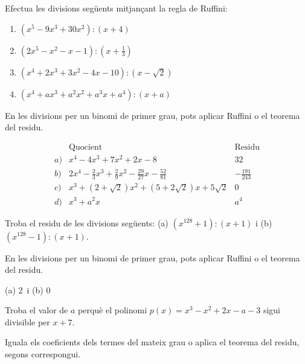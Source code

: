 \begin{exercici}
Efectua les divisions següents mitjançant la regla de Ruffini:

\begin{enumerate}
\item[a)] $(x^{5}-9x^{3}+30x^{2}):(x+4)$

\item[b)] $(2x^{5}-x^{2}-x-1):(x+\frac{1}{3})$

\item[c)] $(x^{4}+2x^{3}+3x^{2}-4x-10):(x-\sqrt{2})$

\item[d)] $(x^{4}+ax^{3}+a^{2}x^{2}+a^{3}x+a^{4}):(x+a)$
\end{enumerate}
\end{exercici}
\begin{indicacio}
En les divisions per un binomi de primer grau, pots aplicar Ruffini o el teorema del residu.
\end{indicacio}

\begin{solucio}
\[
\begin{array}{lll}
& \text{Quocient} & \text{Residu} \\
a) & x^{4}-4x^{3}+7x^{2}+2x-8 & 32 \\
b) & 2x^{4}-\frac{2}{3}x^{3}+\frac{2}{9}x^{2}-\frac{29}{27}x-\frac{52}{81} &
-\frac{191}{243} \\
c) & x^{3}+(2+\sqrt{2})x^{2}+(5+2\sqrt{2})x+5\sqrt{2} & 0 \\
d) & x^{3}+a^{2}x & a^{4}
\end{array}
\]
\end{solucio}

\begin{exercici}
Troba el residu de les divisions següents: (a) $(x^{128}+1):(x+1)$ i
(b) $(x^{128}-1):(x+1)$.
\end{exercici}
\begin{indicacio}
En les divisions per un binomi de primer grau, pots aplicar Ruffini o el teorema del residu.
\end{indicacio}

\begin{solucio}
(a) $2$\ i (b) $0$
\end{solucio}

\begin{exercici}
Troba el valor de $a$ perquè el polinomi $p(x)=x^{3}-x^{2}+2x-a-3$
sigui divisible per $x+7$.
\end{exercici}
\begin{indicacio}
Iguala els coeficients dels termes del mateix grau o aplica el teorema del residu, segons correspongui.
\end{indicacio}

